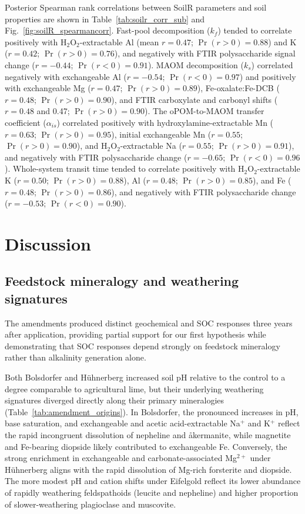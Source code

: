 \documentclass[preprint,12pt]{elsarticle}
\begin{document}
Posterior Spearman rank correlations between SoilR parameters and soil properties are shown in Table~\ref{tab:soilr_corr_sub} and Fig.~\ref{fig:soilR_spearmancorr}. Fast-pool decomposition ($k_f$) tended to correlate positively with H$_2$O$_2$-extractable Al (mean $r = 0.47$; $\Pr(r>0) = 0.88$) and K ($r = 0.42$; $\Pr(r>0) = 0.76$), and negatively with FTIR polysaccharide signal change ($r = -0.44$; $\Pr(r<0) = 0.91$). MAOM decomposition ($k_s$) correlated negatively with exchangeable Al ($r = -0.54$; $\Pr(r<0) = 0.97$) and positively with exchangeable Mg ($r = 0.47$; $\Pr(r>0) = 0.89$), Fe-oxalate:Fe-DCB ($r = 0.48$; $\Pr(r>0) = 0.90$), and FTIR carboxylate and carbonyl shifts ($r = 0.48$ and 0.47; $\Pr(r>0) = 0.90$). The oPOM-to-MAOM transfer coefficient ($\alpha_{is}$) correlated positively with hydroxylamine-extractable Mn ($r = 0.63$; $\Pr(r>0) = 0.95$), initial exchangeable Mn ($r = 0.55$; $\Pr(r>0) = 0.90$), and H$_2$O$_2$-extractable Na ($r = 0.55$; $\Pr(r>0) = 0.91$), and negatively with FTIR polysaccharide change ($r = -0.65$; $\Pr(r<0) = 0.96$). Whole-system transit time tended to correlate positively with H$_2$O$_2$-extractable K ($r = 0.50$; $\Pr(r>0) = 0.88$), Al ($r = 0.48$; $\Pr(r>0) = 0.85$), and Fe ($r = 0.48$; $\Pr(r>0) = 0.86$), and negatively with FTIR polysaccharide change ($r = -0.53$; $\Pr(r<0) = 0.90$). 

\section{Discussion}
\label{sec:discussion}

\subsection{Feedstock mineralogy and weathering signatures}
\label{subsec:treatment_effects}

The amendments produced distinct geochemical and SOC responses three years after application, providing partial support for our first hypothesis while demonstrating that SOC responses depend strongly on feedstock mineralogy rather than alkalinity generation alone.

Both Bolsdorfer and H\"uhnerberg increased soil pH relative to the control to a degree comparable to agricultural lime, but their underlying weathering signatures diverged directly along their primary mineralogies (Table~\ref{tab:amendment_origins}). In Bolsdorfer, the pronounced increases in pH, base saturation, and exchangeable and acetic acid-extractable Na$^{+}$ and K$^{+}$ reflect the rapid incongruent dissolution of nepheline and \aa kermanite, while magnetite and Fe-bearing diopside likely contributed to exchangeable Fe. Conversely, the strong enrichment in exchangeable and carbonate-associated Mg$^{2+}$ under H\"uhnerberg aligns with the rapid dissolution of Mg-rich forsterite and diopside. The more modest pH and cation shifts under Eifelgold reflect its lower abundance of rapidly weathering feldspathoids (leucite and nepheline) and higher proportion of slower-weathering plagioclase and muscovite.
\end{document}
